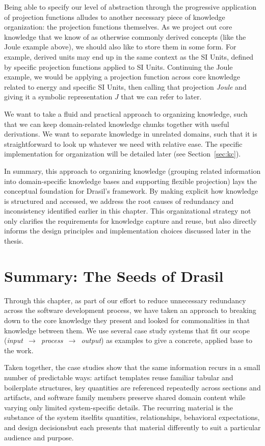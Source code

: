 Being able to specify our level of abstraction through the progressive 
application of projection functions alludes to another necessary piece of
knowledge organization: the projection functions themselves. As we project out 
core knowledge that we know of as otherwise commonly derived concepts (like the 
Joule example above), we should also like to store them in some form. For 
example, derived units may end up in the same context as the SI Units, defined 
by specific projection functions applied to SI Units. Continuing the Joule 
example, we would be applying a projection function across core knowledge 
related to energy and specific SI Units, then calling that projection 
\emph{Joule} and giving it a symbolic representation $J$ that we can refer to 
later.

We want to take a fluid and practical approach to organizing knowledge, such 
that we can keep domain-related knowledge chunks together with useful 
derivations. We want to separate knowledge in unrelated domains, such that it 
is straightforward to look up whatever we need with relative ease. The 
specific implementation for organization will be detailed later (see
Section~\ref{sec:kc}).

In summary, this approach to organizing knowledge (grouping related information 
into domain-specific knowledge bases and supporting flexible projection) lays
the conceptual foundation for Drasil's framework. By making explicit how 
knowledge is structured and accessed, we address the root causes of redundancy 
and inconsistency identified earlier in this chapter. This organizational 
strategy not only clarifies the requirements for knowledge capture and reuse, 
but also directly informs the design principles and implementation choices 
discussed later in the thesis.

\section{Summary: The Seeds of Drasil}

Through this chapter, as part of our effort to reduce unnecessary redundancy 
across the software development process, we have taken an approach to breaking 
down \sfs{} to the core knowledge they present and looked for commonalities in 
that knowledge between them. We use several case study systems that fit our 
scope (\mbox{\emph{input~$\rightarrow$~process~$\rightarrow$~output}}) as 
examples to 
give a concrete, applied base to the work.

Taken together, the case studies show that the same information recurs in a 
small number of predictable ways: artifact templates reuse familiar tabular 
and boilerplate structures, key quantities are referenced repeatedly across 
sections and artifacts, and software family members preserve shared domain 
content while varying only limited system-specific details. The recurring 
material is the substance of the system itself\textemdash{}its quantities, 
relationships, behavioral expectations, and design decisions\textemdash{}but 
each \sf{} presents that material differently to suit a particular audience 
and purpose.

